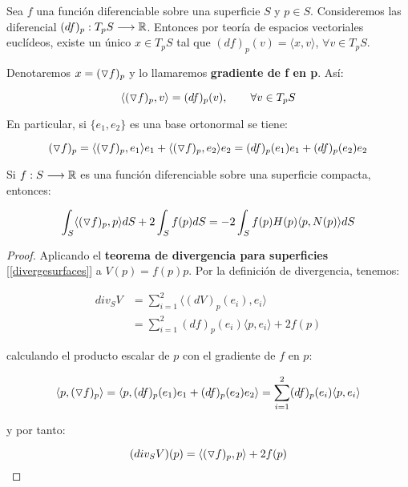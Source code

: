 \begin{definition}[Gradiente]
Sea $f$ una función diferenciable sobre una superficie $S$ y $p \in S$. Consideremos las diferencial $(df)_p: T_pS \longrightarrow \mathbb{R}$. Entonces por teoría de espacios vectoriales euclídeos, existe un único $x \in T_pS$ tal que $(df)_p(v)=  \langle x,v \rangle $, $\forall v \in T_pS$.

Denotaremos $x= (\triangledown f)_p $ y lo llamaremos \textbf{gradiente de f en p}. Así:

\begin{equation*}
    \langle (\triangledown f)_p, v \rangle = (df)_p(v), \qquad \forall v \in T_pS
\end{equation*}

En particular, si $\{e_1, e_2\}$ es una base ortonormal se tiene:

\begin{equation*}
     (\triangledown f)_p = \langle  (\triangledown f)_p , e_1 \rangle e_1 + \langle (\triangledown f)_p, e_2 \rangle e_2 = (df)_p(e_1)e_1 + (df)_p(e_2)e_2
\end{equation*}
\end{definition}

\begin{corolario}\label{corolariogradiente}
Si $f: S \longrightarrow \mathbb{R}$ es una función diferenciable sobre una superficie compacta, entonces:

\begin{equation*}
    \int_S \langle (\triangledown f)_p, p \rangle dS + 2 \int_S f(p)dS = -2 \int_S f(p)H(p) \langle p, N(p) \rangle dS
\end{equation*}
\end{corolario}
\begin{proof}
Aplicando el \textbf{teorema de divergencia para superficies} [\ref{divergesurfaces}] a $V(p)=f(p)p$. Por la definición de divergencia, tenemos:

\begin{align*}
    div_S V &= \sum_{i=1}^2 \langle (dV)_p(e_i), e_i \rangle \\
    &= \sum_{i=1}^2 (df)_p(e_i) \langle p, e_i \rangle + 2f(p)
\end{align*}

calculando el producto escalar de $p$ con el gradiente de $f$ en $p$:

\begin{equation*}
    \langle p, (\triangledown f)_p \rangle = \langle p, (df)_p(e_1)e_1 + (df)_p(e_2)e_2 \rangle = \sum_{i=1}^2 (df)_p(e_i) \langle p, e_i \rangle
\end{equation*}

y por tanto:

\begin{equation*}
    (div_S V)(p) = \langle (\triangledown f)_p, p \rangle + 2f(p)
\end{equation*}
\end{proof}
